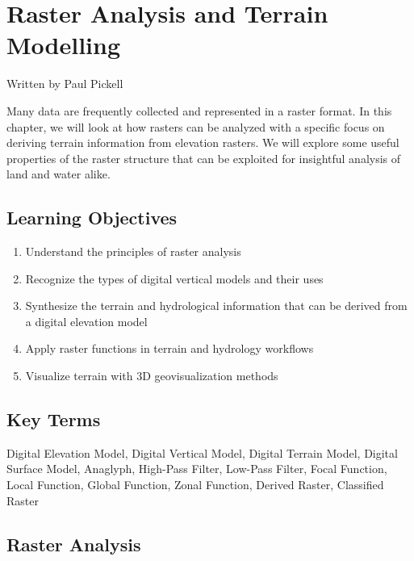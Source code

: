 \documentclass[
]{book}
\providecommand{\tightlist}{%
  \setlength{\itemsep}{0pt}\setlength{\parskip}{0pt}}
\begin{document}
\chapter{Raster Analysis and Terrain Modelling}\label{raster-analysis-and-terrain-modelling}

Written by
Paul Pickell

Many data are frequently collected and represented in a raster format. In this chapter, we will look at how rasters can be analyzed with a specific focus on deriving terrain information from elevation rasters. We will explore some useful properties of the raster structure that can be exploited for insightful analysis of land and water alike.

\section*{Learning Objectives}\label{learning-objectives-7}

\begin{enumerate}
\def\labelenumi{\arabic{enumi}.}
\tightlist
\item
  Understand the principles of raster analysis
\item
  Recognize the types of digital vertical models and their uses
\item
  Synthesize the terrain and hydrological information that can be derived from a digital elevation model
\item
  Apply raster functions in terrain and hydrology workflows
\item
  Visualize terrain with 3D geovisualization methods
\end{enumerate}

\section*{Key Terms}\label{key-terms-7}

Digital Elevation Model, Digital Vertical Model, Digital Terrain Model, Digital Surface Model, Anaglyph, High-Pass Filter, Low-Pass Filter, Focal Function, Local Function, Global Function, Zonal Function, Derived Raster, Classified Raster

\section{Raster Analysis}\label{raster-analysis}
\end{document}
